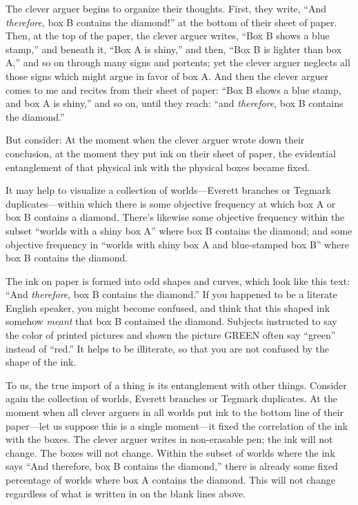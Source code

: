 {
 The clever arguer begins to organize their thoughts. First, they
write, ``And \textit{therefore}, box B contains the
diamond!'' at the bottom of their sheet of paper.
Then, at the top of the paper, the clever arguer writes,
``Box B shows a blue stamp,'' and
beneath it, ``Box A is shiny,'' and
then, ``Box B is lighter than box
A,'' and so on through many signs and portents; yet
the clever arguer neglects all those signs which might argue in favor
of box A. And then the clever arguer comes to me and recites from their
sheet of paper: ``Box B shows a blue stamp, and box A
is shiny,'' and so on, until they reach:
``and \textit{therefore}, box B contains the
diamond.''}

{
 But consider: At the moment when the clever arguer wrote down
their conclusion, at the moment they put ink on their sheet of paper,
the evidential entanglement of that physical ink with the physical
boxes became fixed.}

{
 It may help to visualize a collection of worlds---Everett branches
or Tegmark duplicates{}---within which there is some objective
frequency at which box A or box B contains a diamond.
There's likewise some objective frequency within the
subset ``worlds with a shiny box A''
where box B contains the diamond; and some objective frequency in
``worlds with shiny box A and blue-stamped box
B'' where box B contains the diamond.}

{
 The ink on paper is formed into odd shapes and curves, which look
like this text: ``And \textit{therefore}, box B
contains the diamond.'' If you happened to be a
literate English speaker, you might become confused, and think that
this shaped ink somehow \textit{meant} that box B contained the
diamond. Subjects instructed to say the color of printed pictures and
shown the picture GREEN often say
``green'' instead of
``red.'' It helps to be illiterate,
so that you are not confused by the shape of the ink.}

{
 To us, the true import of a thing is its entanglement with other
things. Consider again the collection of worlds, Everett branches or
Tegmark duplicates. At the moment when all clever arguers in all worlds
put ink to the bottom line of their paper---let us suppose this is a
single moment---it fixed the correlation of the ink with the boxes. The
clever arguer writes in non-erasable pen; the ink will not change. The
boxes will not change. Within the subset of worlds where the ink says
``And therefore, box B contains the
diamond,'' there is already some fixed percentage of
worlds where box A contains the diamond. This will not change
regardless of what is written in on the blank lines above.}

